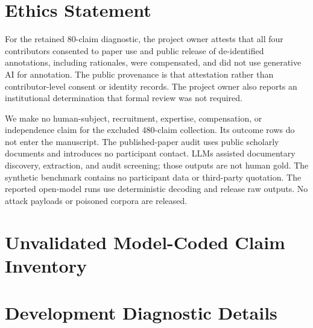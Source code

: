 \documentclass[11pt]{article}
\begin{document}
\section*{Ethics Statement}

For the retained 80-claim diagnostic, the project owner attests that all four
contributors consented to paper use and public release of de-identified
annotations, including rationales, were compensated, and did not use
generative AI for annotation. The public provenance is that attestation rather
than contributor-level consent or identity records. The project owner also
reports an institutional determination that formal review was not required.

We make no human-subject, recruitment, expertise, compensation, or
independence claim for the excluded 480-claim collection. Its outcome rows do
not enter the manuscript. The published-paper audit uses public scholarly
documents and introduces no participant contact. LLMs assisted documentary
discovery, extraction, and audit screening; those outputs are not human gold.
The synthetic benchmark contains no participant data or third-party
quotation. The reported open-model runs use deterministic decoding and release
raw outputs. No attack payloads or poisoned corpora are released.

\clearpage


\clearpage
\appendix



\section{Unvalidated Model-Coded Claim Inventory}
\label{sec:appendix-claim-audit}




\FloatBarrier
\section{Development Diagnostic Details}






\end{document}
